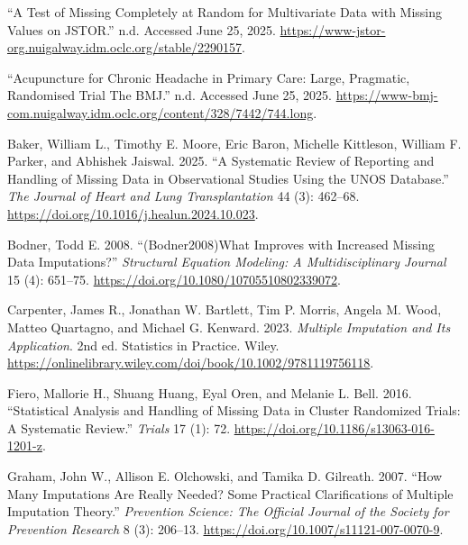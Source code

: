 \documentclass{article}
\newlength{\cslhangindent}
\newenvironment{CSLReferences}[2] %
 {\begin{list}{}{%
  \setlength{\itemindent}{0pt}
  \setlength{\leftmargin}{0pt}
  \setlength{\parsep}{0pt}
  \ifodd #1
   \setlength{\leftmargin}{\cslhangindent}
   \setlength{\itemindent}{-1\cslhangindent}
  \fi
  \setlength{\itemsep}{#2\baselineskip}}}
 {\end{list}}
\begin{document}
\newpage

\label{refs}
\begin{CSLReferences}{1}{0}
{``A {Test} of {Missing} {Completely} at {Random} for {Multivariate}
{Data} with {Missing} {Values} on {JSTOR}.''} n.d. Accessed June 25,
2025. \url{https://www-jstor-org.nuigalway.idm.oclc.org/stable/2290157}.

{``Acupuncture for Chronic Headache in Primary Care: Large, Pragmatic,
Randomised Trial {\textbar} {The} {BMJ}.''} n.d. Accessed June 25, 2025.
\url{https://www-bmj-com.nuigalway.idm.oclc.org/content/328/7442/744.long}.

Baker, William L., Timothy E. Moore, Eric Baron, Michelle Kittleson,
William F. Parker, and Abhishek Jaiswal. 2025. {``A Systematic Review of
Reporting and Handling of Missing Data in Observational Studies Using
the {UNOS} Database.''} \emph{The Journal of Heart and Lung
Transplantation} 44 (3): 462--68.
\url{https://doi.org/10.1016/j.healun.2024.10.023}.

Bodner, Todd E. 2008. {``({Bodner2008}){What} {Improves} with
{Increased} {Missing} {Data} {Imputations}?''} \emph{Structural Equation
Modeling: A Multidisciplinary Journal} 15 (4): 651--75.
\url{https://doi.org/10.1080/10705510802339072}.

Carpenter, James R., Jonathan W. Bartlett, Tim P. Morris, Angela M.
Wood, Matteo Quartagno, and Michael G. Kenward. 2023. \emph{Multiple
{Imputation} and Its {Application}}. 2nd ed. Statistics in {Practice}.
Wiley.
\url{https://onlinelibrary.wiley.com/doi/book/10.1002/9781119756118}.

Fiero, Mallorie H., Shuang Huang, Eyal Oren, and Melanie L. Bell. 2016.
{``Statistical Analysis and Handling of Missing Data in Cluster
Randomized Trials: A Systematic Review.''} \emph{Trials} 17 (1): 72.
\url{https://doi.org/10.1186/s13063-016-1201-z}.

Graham, John W., Allison E. Olchowski, and Tamika D. Gilreath. 2007.
{``How Many Imputations Are Really Needed? {Some} Practical
Clarifications of Multiple Imputation Theory.''} \emph{Prevention
Science: The Official Journal of the Society for Prevention Research} 8
(3): 206--13. \url{https://doi.org/10.1007/s11121-007-0070-9}.


\end{CSLReferences}
\end{document}
